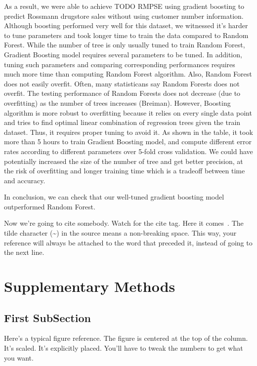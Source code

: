 \documentclass[letterpaper,twocolumn,10pt]{article}
\begin{document}
As a result, we were able to achieve TODO RMPSE using gradient boosting to predict Rossmann drugstore sales without using customer number information. Although boosting performed very well for this dataset, we witnessed it's harder to tune parameters and took longer time to train the data compared to Random Forest. While the number of tree is only usually tuned to train Random Forest, Gradient Boosting model requires several parameters to be tuned. In addition, tuning such parameters and comparing corresponding performances requires much more time than computing Random Forest algorithm. Also, Random Forest does not easily overfit. Often, many statisticans say Random Forests does not overfit. The testing performance of Random Forests does not decrease (due to overfitting) as the number of trees increases (Breiman). However, Boosting algorithm is more robust to overfitting because it relies on every single data point and tries to find optimal linear combination of regression trees given the train dataset. Thus, it requires proper tuning to avoid it. As shown in the table, it took more than 5 hours to train Gradient Boosting model, and compute different error rates according to different parameters over 5-fold cross validation. We could have potentially increased the size of the number of tree and get better precision, at the risk of overfitting and longer training time which is a tradeoff between time and accuracy.

In conclusion, we can check that our well-tuned gradient boosting model outperformed Random Forest. 





Now we're going to cite somebody.  Watch for the cite tag.
Here it comes~\cite{Chaum1981,Diffie1976}.  The tilde character (\~{})
in the source means a non-breaking space.  This way, your reference will
always be attached to the word that preceded it, instead of going to the
next line.

\section{Supplementary Methods}
\subsection{First SubSection}

Here's a typical figure reference.  The figure is centered at the
top of the column.  It's scaled.  It's explicitly placed.  You'll
have to tweak the numbers to get what you want.\\
\end{document}
